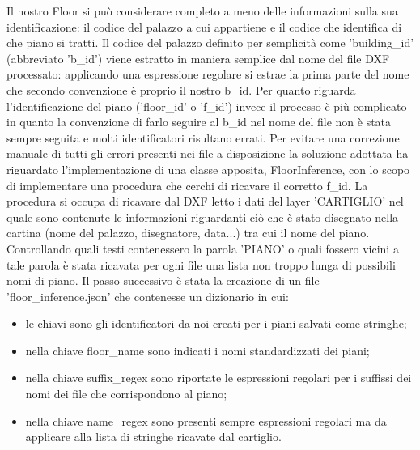 \documentclass[12pt]{report}
\begin{document}
Il nostro Floor si può considerare completo a meno delle informazioni sulla sua identificazione: il codice del palazzo a cui appartiene e il codice che identifica di che piano si tratti. 
Il codice del palazzo definito per semplicità come 'building\_id' (abbreviato 'b\_id') viene estratto in maniera semplice dal nome del file DXF processato: applicando una espressione regolare si estrae la prima parte del nome che secondo convenzione è proprio il nostro b\_id. 
Per quanto riguarda l'identificazione del piano ('floor\_id' o 'f\_id') invece il processo è più complicato in quanto la convenzione di farlo seguire al b\_id nel nome del file non è stata sempre seguita e molti identificatori risultano errati. 
Per evitare una correzione manuale di tutti gli errori presenti nei file a disposizione la soluzione adottata ha riguardato l'implementazione di una classe apposita, FloorInference, con lo scopo di implementare una procedura che cerchi di ricavare il corretto f\_id.
La procedura si occupa di ricavare dal DXF letto i dati del layer 'CARTIGLIO' nel quale sono contenute le informazioni riguardanti ciò che è stato disegnato nella cartina (nome del palazzo, disegnatore, data...) tra cui il nome del piano.
Controllando quali testi contenessero la parola 'PIANO' o quali fossero vicini a tale parola è stata ricavata per ogni file una lista non troppo lunga di possibili nomi di piano.  
Il passo successivo è stata la creazione di un file 'floor\_inference.json' che contenesse un dizionario in cui:
\begin{itemize}
\item le chiavi sono gli identificatori da noi creati per i piani salvati come stringhe;
\item nella chiave floor\_name sono indicati i nomi standardizzati dei piani;
\item nella chiave suffix\_regex sono riportate le espressioni regolari per i suffissi dei nomi dei file che corrispondono al piano;
\item nella chiave name\_regex sono presenti sempre espressioni regolari ma da applicare alla lista di stringhe ricavate dal cartiglio.
\end{itemize}

\end{document}
